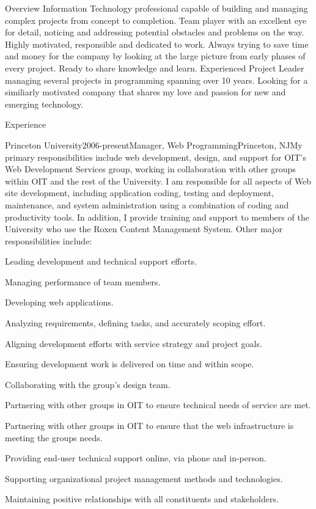 \documentclass[12pt]{resume}
\begin{document}
\begin{rSection}{Overview}
Information Technology professional capable of building and managing complex projects from concept to completion. Team player with an excellent eye for detail, noticing and addressing potential obstacles and problems on the way. Highly motivated, responsible and dedicated to work. Always trying to save time and money for the company by looking at the large picture from early phases of every project. Ready to share knowledge and learn. Experienced Project Leader managing several projects in programming spanning over 10 years. Looking for a similiarly motivated company that shares my love and passion for new and emerging technology.
\end{rSection}

\begin{rSection}{Experience}

\begin{rSubsection}{Princeton University}{2006-present}{Manager, Web Programming}{Princeton, NJ}{My primary responsibilities include web development, design, and support for OIT’s Web Development Services group, working in collaboration with other groups within OIT and the rest of the University. I am responsible for all aspects of Web site development, including application coding, testing and deployment, maintenance, and system administration using a combination of coding and productivity tools. In addition, I provide training and support to members of the University who use the Roxen Content Management System. Other major responsibilities include:}
\item Leading development and technical support efforts.
\item Managing performance of team members.
\item Developing web applications.
\item Analyzing requirements, defining tasks, and accurately scoping effort.
\item Aligning development efforts with service strategy and project goals.
\item Ensuring development work is delivered on time and within scope.
\item Collaborating with the group’s design team.
\item Partnering with other groups in OIT to ensure technical needs of service are met.
\item Partnering with other groups in OIT to ensure that the web infrastructure is meeting the groups needs.
\item Providing end-user technical support online, via phone and in-person.
\item Supporting organizational project management methods and technologies.
\item Maintaining positive relationships with all constituents and stakeholders.
\end{rSubsection}


\end{rSection}
\end{document}
